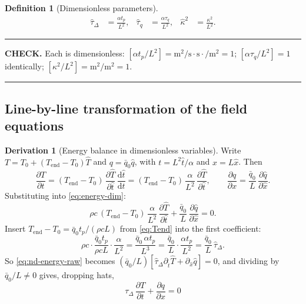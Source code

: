 \documentclass[11pt,a4paper]{article}
\theoremstyle{definition}
\newtheorem{definitionx}{Definition}[section]
\newtheorem{derivationx}{Derivation}[section]
\newenvironment{checkbox}%
  {\par\medskip\noindent\begin{minipage}{\linewidth}%
   \rule{\linewidth}{0.4pt}\par\noindent\textbf{CHECK.}\enspace}%
  {\par\rule{\linewidth}{0.4pt}\end{minipage}\par\medskip}
\newcommand{\tq}{\tau_{q}}
\newcommand{\kk}{\kappa^{2}}
\begin{document}
\begin{definitionx}[Dimensionless parameters]
\label{def:ndparams}
\begin{align}
  \hat\tau_{\Delta} &= \frac{\alpha t_{p}}{L^{2}} , &
  \hat\tau_{q}      &= \frac{\alpha \tq}{L^{2}} , &
  \hat\kappa^{2}    &= \frac{\kk}{L^{2}} .
  \label{eq:ndparams}
\end{align}
\end{definitionx}

\begin{checkbox}
Each is dimensionless:
$[\alpha t_{p}/L^{2}]=\si{\metre\squared\per\second}\cdot\si{\second}\cdot
\si{\per\metre\squared}=1$;
$[\alpha\tq/L^{2}]=1$ identically;
$[\kk/L^{2}]=\si{\metre\squared}/\si{\metre\squared}=1$.
\end{checkbox}

\subsection{Line-by-line transformation of the field equations}

\begin{derivationx}[Energy balance in dimensionless variables]
\label{der:nd-energy}
Write $T = T_{0}+(T_{\mathrm{end}}-T_{0})\hat T$ and $q=\bar q_{0}\hat q$, with
$t=L^{2}\hat t/\alpha$ and $x=L\hat x$. Then
\begin{equation}
  \frac{\partial T}{\partial t}
   = (T_{\mathrm{end}}-T_{0})\,\frac{\partial \hat T}{\partial \hat t}\,
     \frac{\mathrm{d}\hat t}{\mathrm{d}t}
   = (T_{\mathrm{end}}-T_{0})\,\frac{\alpha}{L^{2}}\,
     \frac{\partial \hat T}{\partial \hat t} ,
  \qquad
  \frac{\partial q}{\partial x}
   = \frac{\bar q_{0}}{L}\,\frac{\partial \hat q}{\partial \hat x} .
  \label{eq:nd-chain}
\end{equation}
Substituting into \eqref{eq:energy-dim}:
\begin{equation}
  \rho c\,(T_{\mathrm{end}}-T_{0})\,\frac{\alpha}{L^{2}}\,
    \frac{\partial\hat T}{\partial\hat t}
  + \frac{\bar q_{0}}{L}\,\frac{\partial\hat q}{\partial\hat x} = 0 .
  \label{eq:nd-energy-raw}
\end{equation}
Insert $T_{\mathrm{end}}-T_{0}=\bar q_{0}t_{p}/(\rho c L)$ from
\eqref{eq:Tend} into the first coefficient:
\begin{equation}
  \rho c \cdot \frac{\bar q_{0}t_{p}}{\rho c L}\cdot\frac{\alpha}{L^{2}}
  = \frac{\bar q_{0}\,\alpha t_{p}}{L^{3}}
  = \frac{\bar q_{0}}{L}\cdot\frac{\alpha t_{p}}{L^{2}}
  = \frac{\bar q_{0}}{L}\,\hat\tau_{\Delta} .
  \label{eq:nd-coeff}
\end{equation}
So \eqref{eq:nd-energy-raw} becomes
$(\bar q_{0}/L)\left[\hat\tau_{\Delta}\partial_{\hat t}\hat T
 + \partial_{\hat x}\hat q\right]=0$, and dividing by
$\bar q_{0}/L\neq0$ gives, dropping hats,
\begin{equation}
  \boxed{\ \tau_{\Delta}\,\frac{\partial T}{\partial t}
        + \frac{\partial q}{\partial x} = 0\ }
  \label{eq:nd-energy}
\end{equation}
\end{derivationx}
\end{document}
